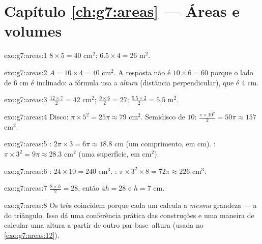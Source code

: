 \section*{Capítulo \ref{ch:g7:areas} --- Áreas e volumes}

\begin{solution}{exo:g7:areas:1}
$8 \times 5 = 40$ cm$^2$; \qquad $6.5 \times 4 = 26$ m$^2$.
\end{solution}

\begin{solution}{exo:g7:areas:2}
$A = 10 \times 4 = 40$ cm$^2$. A resposta não é $10 \times 6 = 60$
porque o lado de $6$ cm é inclinado: a fórmula usa a \emph{altura}
(distância perpendicular), que é $4$ cm.
\end{solution}

\begin{solution}{exo:g7:areas:3}
$\frac{12 \times 7}{2} = 42$ cm$^2$; \quad
$\frac{9 \times 6}{2} = 27$; \quad
$\frac{5.5 \times 2}{2} = 5.5$ m$^2$.
\end{solution}

\begin{solution}{exo:g7:areas:4}
Disco: $\pi \times 5^2 = 25\pi \approx 79$ cm$^2$. Semidisco de 
$10$: $\frac{\pi \times 10^2}{2} = 50\pi \approx 157$ cm$^2$.
\end{solution}

\begin{solution}{exo:g7:areas:5}
: $2\pi \times 3 = 6\pi \approx 18.8$ cm (um comprimento, em
cm). : $\pi \times 3^2 = 9\pi \approx 28.3$ cm$^2$ (uma superfície,
em cm$^2$).
\end{solution}

\begin{solution}{exo:g7:areas:6}
: $24 \times 10 = 240$ cm$^3$. :
$\pi \times 3^2 \times 8 = 72\pi \approx 226$ cm$^3$.
\end{solution}

\begin{solution}{exo:g7:areas:7}
$\frac{8 \times h}{2} = 28$, então $4h = 28$ e $h = 7$ cm.
\end{solution}

\begin{solution}{exo:g7:areas:8}
Os três  coincidem porque cada um calcula a \emph{mesma}
grandeza --- a  do triângulo. Isso dá uma conferência prática das
construções e uma maneira de calcular uma altura a partir de outro par
base--altura (usada no \cref{exo:g7:areas:12}).
\end{solution}

